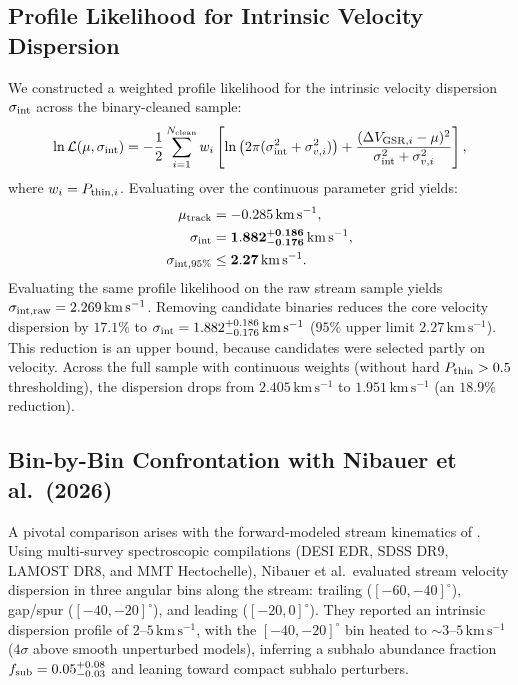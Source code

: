 \documentclass[twocolumn]{aastex631}
\begin{document}
\subsection{Profile Likelihood for Intrinsic Velocity Dispersion}
We constructed a weighted profile likelihood for the intrinsic velocity dispersion $\sigma_{\rm int}$ across the binary-cleaned sample:
\begin{equation}
\ln \mathcal{L}(\mu, \sigma_{\rm int}) = -\frac{1}{2} \sum_{i=1}^{N_{\rm clean}} w_i \left[ \ln\left(2\pi (\sigma_{\rm int}^2 + \sigma_{v, i}^2)\right) + \frac{(\Delta V_{{\rm GSR}, i} - \mu)^2}{\sigma_{\rm int}^2 + \sigma_{v, i}^2} \right],
\end{equation}
where $w_i = P_{{\rm thin}, i}$. Evaluating over the continuous parameter grid yields:
\begin{align}
\mu_{\rm track} &= -0.285\,\mathrm{km\,s^{-1}}, \\
\mathbf{\sigma_{\rm int}} &= \mathbf{1.882_{-0.176}^{+0.186}\,\mathrm{km\,s^{-1}}}, \\
\sigma_{\rm int, 95\%} &\le \mathbf{2.27\,\mathrm{km\,s^{-1}}}.
\end{align}
Evaluating the same profile likelihood on the raw stream sample yields $\sigma_{\rm int, raw} = 2.269\,\mathrm{km\,s^{-1}}$. Removing candidate binaries reduces the core velocity dispersion by $17.1\%$ to $\sigma_{\rm int} = 1.882_{-0.176}^{+0.186}\,\mathrm{km\,s^{-1}}$ ($95\%$ upper limit $2.27\,\mathrm{km\,s^{-1}}$). This reduction is an upper bound, because candidates were selected partly on velocity. Across the full sample with continuous weights (without hard $P_{\rm thin} > 0.5$ thresholding), the dispersion drops from $2.405\,\mathrm{km\,s^{-1}}$ to $1.951\,\mathrm{km\,s^{-1}}$ (an $18.9\%$ reduction).

\subsection{Bin-by-Bin Confrontation with Nibauer et al.\ (2026)}
\label{sec:nibauer_tension}

A pivotal comparison arises with the forward-modeled stream kinematics of \citet{Nibauer2026}. Using multi-survey spectroscopic compilations (DESI EDR, SDSS DR9, LAMOST DR8, and MMT Hectochelle), Nibauer et al.\ evaluated stream velocity dispersion in three angular bins along the stream: trailing ($[-60, -40]^\circ$), gap/spur ($[-40, -20]^\circ$), and leading ($[-20, 0]^\circ$). They reported an intrinsic dispersion profile of $2\text{--}5\,\mathrm{km\,s^{-1}}$, with the $[-40, -20]^\circ$ bin heated to $\sim 3\text{--}5\,\mathrm{km\,s^{-1}}$ ($4\sigma$ above smooth unperturbed models), inferring a subhalo abundance fraction $f_{\rm sub} = 0.05^{+0.08}_{-0.03}$ and leaning toward compact subhalo perturbers.
\end{document}

